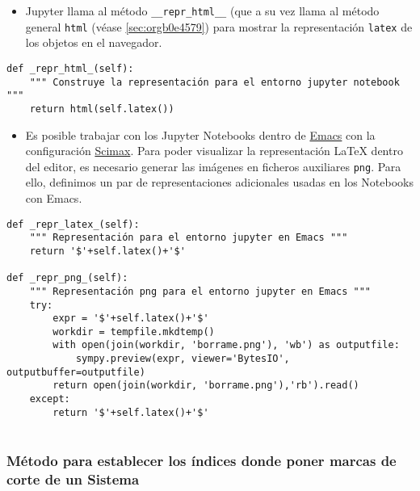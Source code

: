 \documentclass[11pt]{report}
\begin{document}
\begin{itemize}
\item Jupyter llama al método \texttt{\_\_repr\_html\_\_} (que a su vez llama al
método general \texttt{html} (véase \ref{sec:orgb0e4579}) para mostrar la representación \texttt{latex} de los
objetos en el navegador.
\end{itemize}

\begin{verbatim}
def _repr_html_(self):
    """ Construye la representación para el entorno jupyter notebook """
    return html(self.latex())

\end{verbatim}

\begin{itemize}
\item Es posible trabajar con los Jupyter Notebooks dentro de \href{https://www.gnu.org/software/emacs/}{Emacs} con la
configuración \href{https://github.com/jkitchin/scimax}{Scimax}. Para poder visualizar la representación
\LaTeX{} dentro del editor, es necesario generar las imágenes en
ficheros auxiliares \texttt{png}. Para ello, definimos un par de
representaciones adicionales usadas en los Notebooks con Emacs.
\end{itemize}

\begin{verbatim}
def _repr_latex_(self):
    """ Representación para el entorno jupyter en Emacs """
    return '$'+self.latex()+'$'

def _repr_png_(self):
    """ Representación png para el entorno jupyter en Emacs """
    try:
        expr = '$'+self.latex()+'$'
        workdir = tempfile.mkdtemp()
        with open(join(workdir, 'borrame.png'), 'wb') as outputfile:
            sympy.preview(expr, viewer='BytesIO', outputbuffer=outputfile)
        return open(join(workdir, 'borrame.png'),'rb').read()
    except:
        return '$'+self.latex()+'$'
                                                               
\end{verbatim}

\subsubsection{Método para establecer los índices donde poner marcas de corte de un Sistema}
\label{sec:org17d5de3}
\end{document}
